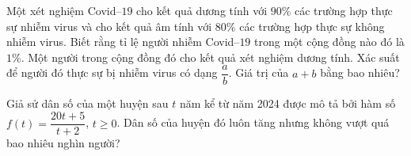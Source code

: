 \begin{ex} %
	Một xét nghiệm Covid--$19$ cho kết quả dương tính với $90\%$ các trường hợp thực sự nhiễm virus và cho kết quả âm tính với $80\%$ các trường hợp thực sự không nhiễm virus. Biết rằng tỉ lệ người nhiễm Covid--$19$ trong một cộng đồng nào đó là $1\%$. Một người trong cộng đồng đó cho kết quả xét nghiệm dương tính. Xác suất để người đó thực sự bị nhiễm virus có dạng $\dfrac{a}{b}$. Giá trị của $a+b$ bằng bao nhiêu?
\end{ex}

\begin{ex} %
	Giả sử dân số của một huyện sau $t$ năm kể từ năm 2024 được mô tả bởi hàm số $f(t)=\dfrac{20t+5}{t+2}$, $t\ge 0$. Dân số của huyện đó luôn tăng nhưng không vượt quá bao nhiêu nghìn người?
\end{ex}


